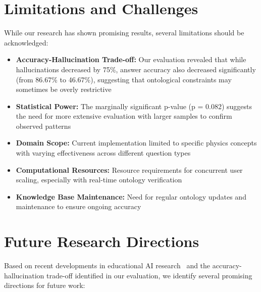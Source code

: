 \section{Limitations and Challenges}
\label{sec:limitations}

While our research has shown promising results, several limitations should be acknowledged:

\begin{itemize}
    \item \textbf{Accuracy-Hallucination Trade-off:} Our evaluation revealed that while hallucinations decreased by 75\%, answer accuracy also decreased significantly (from 86.67\% to 46.67\%), suggesting that ontological constraints may sometimes be overly restrictive
    
    \item \textbf{Statistical Power:} The marginally significant p-value (p = 0.082) suggests the need for more extensive evaluation with larger samples to confirm observed patterns
    
    \item \textbf{Domain Scope:} Current implementation limited to specific physics concepts with varying effectiveness across different question types
    
    \item \textbf{Computational Resources:} Resource requirements for concurrent user scaling, especially with real-time ontology verification
    
    \item \textbf{Knowledge Base Maintenance:} Need for regular ontology updates and maintenance to ensure ongoing accuracy
\end{itemize}

\section{Future Research Directions}
\label{sec:future-work}

Based on recent developments in educational AI research~\cite{zhang2024future} and the accuracy-hallucination trade-off identified in our evaluation, we identify several promising directions for future work:


